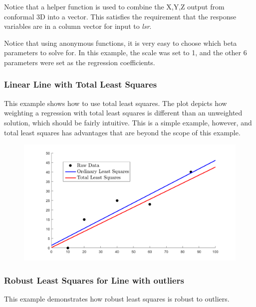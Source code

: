 \documentclass{article}
\begin{document}
	Notice that a helper function is used to combine the X,Y,Z output from conformal 3D into a vector.  This satisfies the requirement that the response variables are in a column vector for input to \textit{lsr}.
	
	
	\clearpage
	Notice that using anonymous functions, it is very easy to choose which beta parameters to solve for.  In this example, the scale was set to 1, and the other 6 parameters were set as the regression coefficients.  
	
	
	\clearpage
	\subsubsection*{Linear Line with Total Least Squares}
	This example shows how to use total least squares.  The plot depicts how weighting a regression with total least squares is different than an unweighted solution, which should be fairly intuitive.  This is a simple example, however, and total least squares has advantages that are beyond the scope of this example.
	
	
	\begin{figure}[H]
		\centering
		\includegraphics[width = \linewidth]{tls}
	\end{figure}
	
	\clearpage
	\subsubsection*{Robust Least Squares for Line with outliers}
	This example demonstrates how robust least squares is robust to outliers.
	
\end{document}
